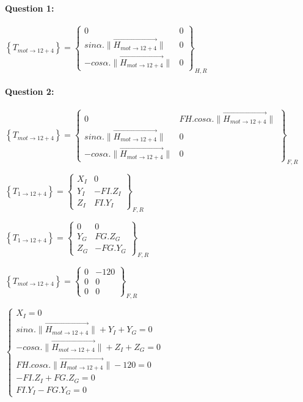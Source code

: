\paragraph{Question 1:}

$\left\{T_{mot\rightarrow 12+4}\right\}=\left\{
\begin{array}{cc}
0 & 0 \\
sin\alpha.\|\overrightarrow{H_{mot\rightarrow 12+4}}\| & 0 \\
-cos\alpha.\|\overrightarrow{H_{mot\rightarrow 12+4}}\| & 0
\end{array}
\right\}_{H,R}$

\paragraph{Question 2:}

$\left\{T_{mot\rightarrow 12+4}\right\}=\left\{
\begin{array}{cc}
0 & FH.cos\alpha.\|\overrightarrow{H_{mot\rightarrow 12+4}}\| \\
sin\alpha.\|\overrightarrow{H_{mot\rightarrow 12+4}}\| & 0 \\
-cos\alpha.\|\overrightarrow{H_{mot\rightarrow 12+4}}\| & 0
\end{array}
\right\}_{F,R}$

$\left\{T_{1\rightarrow 12+4}\right\}=\left\{
\begin{array}{cc}
X_I & 0 \\
Y_I & -FI.Z_I \\
Z_I & FI.Y_I
\end{array}
\right\}_{F,R}$

$\left\{T_{1\rightarrow 12+4}\right\}=\left\{
\begin{array}{cc}
0 & 0 \\
Y_G & FG.Z_G \\
Z_G & -FG.Y_G
\end{array}
\right\}_{F,R}$

$\left\{T_{mot\rightarrow 12+4}\right\}=\left\{
\begin{array}{cc}
0 & -120 \\
0 & 0 \\
0 & 0
\end{array}
\right\}_{F,R}$


$\left\{
\begin{array}{l}
X_I=0 \\
sin\alpha.\|\overrightarrow{H_{mot\rightarrow 12+4}}\|+Y_I+Y_G=0 \\
-cos\alpha.\|\overrightarrow{H_{mot\rightarrow 12+4}}\|+Z_I+Z_G=0 \\
FH.cos\alpha.\|\overrightarrow{H_{mot\rightarrow 12+4}}\|-120=0 \\
-FI.Z_I+FG.Z_G=0 \\
FI.Y_I-FG.Y_G=0
\end{array}
\right.$

